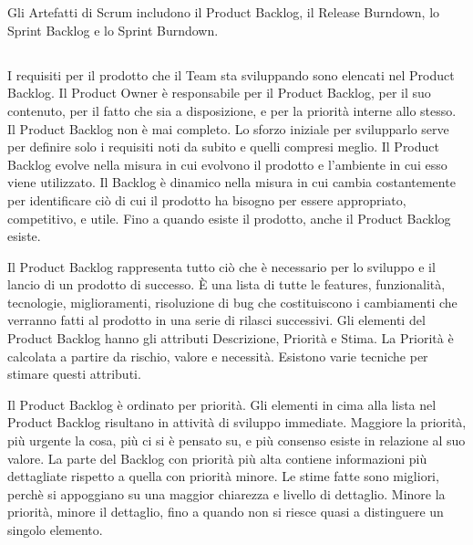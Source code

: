\section*{\color{Blue}{ARTEFATTI}}
\label{sec:artifacts}
Gli Artefatti di Scrum includono il Product Backlog, il  Release Burndown, lo Sprint Backlog e lo Sprint Burndown.

\subsection*{\color{Blue}{PRODUCT BACKLOG E RELEASE BURNDOWN}}
\label{sec:productbacklog}

I requisiti per il prodotto che il Team sta sviluppando sono elencati nel Product Backlog. Il Product Owner \`e responsabile per il Product Backlog, per il suo contenuto, per il fatto che sia a disposizione, e per
la priorit\`a interne allo stesso. Il Product Backlog non \`e  mai completo. Lo sforzo iniziale per svilupparlo serve per definire solo i requisiti noti da subito e quelli compresi meglio.
Il Product Backlog evolve nella misura in cui evolvono il prodotto e l'ambiente in cui esso viene utilizzato. Il Backlog \`e  dinamico nella misura in cui cambia costantemente per 
identificare ci\`o di cui il prodotto ha bisogno per essere appropriato, competitivo, e utile. Fino a quando esiste il prodotto, anche il Product Backlog esiste.

Il Product Backlog rappresenta tutto ci\`o che \`e  necessario per lo sviluppo e il lancio di un prodotto di successo. \`E una lista di tutte le features, funzionalit\`a, tecnologie, miglioramenti, risoluzione di bug
che costituiscono i cambiamenti che verranno fatti al prodotto in una serie di rilasci successivi. Gli elementi del Product Backlog hanno gli attributi Descrizione, Priorit\`a e Stima. La Priorit\`a \`e  calcolata a partire 
da rischio, valore e necessit\`a. Esistono varie tecniche per stimare questi attributi.


Il Product Backlog \`e ordinato per priorit\`a. Gli elementi in cima alla lista nel Product Backlog risultano in attivit\`a di sviluppo immediate. Maggiore la priorit\`a, pi\`u urgente la cosa, pi\`u ci si \`e pensato su, e pi\`u consenso esiste 
in relazione al suo valore. La parte del Backlog con priorit\`a pi\`u alta contiene informazioni pi\`u dettagliate rispetto a quella con priorit\`a minore. Le stime fatte sono migliori, perch\`e si appoggiano su una maggior chiarezza e livello di
dettaglio. Minore la priorit\`a, minore il dettaglio, fino a quando non si riesce quasi a distinguere un singolo elemento.

